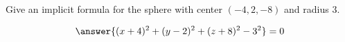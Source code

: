 \documentclass{ximera}
\author{Bart Snapp}
\begin{document}
\begin{exercise}
  Give an implicit formula for the sphere with center $(-4,2,-8)$ and radius $3$.
  \begin{prompt}
  \[
  \answer{(x+4)^2 + (y-2)^2 + (z+8)^2-3^2}=0
  \]
  \end{prompt}
\end{exercise}
\end{document}
